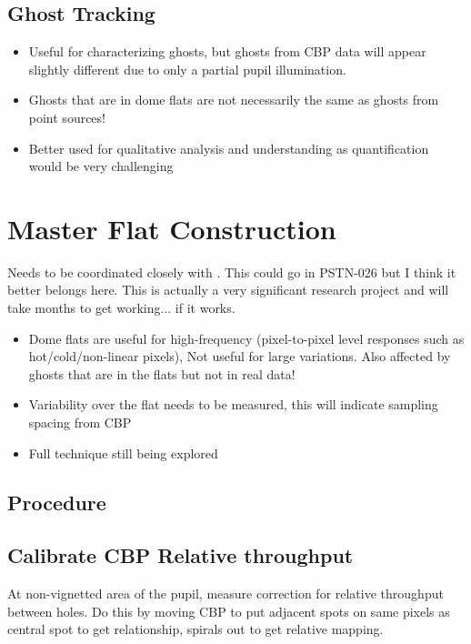\subsection{Ghost Tracking}

\begin{itemize}
	\item Useful for characterizing ghosts, but ghosts from CBP data will appear slightly different due to only a partial pupil illumination. 
	\item Ghosts that are in dome flats are not necessarily the same as ghosts from point sources!
	\item Better used for qualitative analysis and understanding as quantification would be very challenging
\end{itemize}

\section{Master Flat Construction}
\label{sec:MasterFlat}

Needs to be coordinated closely with \cite{PSTN-026}. This could go in PSTN-026 but I think it better belongs here. This is actually a very significant research project and will take months to get working... if it works.

\begin{itemize}
	\item Dome flats are useful for high-frequency (pixel-to-pixel level responses such as hot/cold/non-linear pixels), Not useful for large variations. Also affected by ghosts that are in the flats but not in real data!
	\item Variability over the flat needs to be measured, this will indicate sampling spacing from CBP
	\item Full technique still being explored
\end{itemize}

\subsection{Procedure}

\subsection{Calibrate CBP Relative throughput}

At non-vignetted area of the pupil, measure correction for relative throughput between holes. Do this by moving CBP to put adjacent spots on same pixels as central spot to get relationship, spirals out to get relative mapping.

